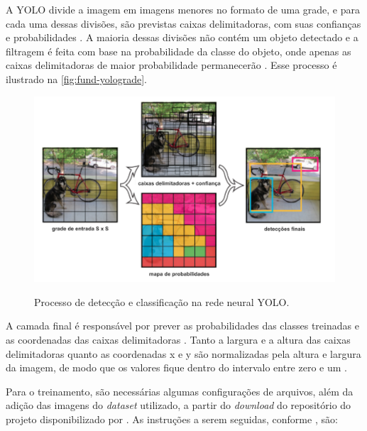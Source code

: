 A YOLO divide a imagem em imagens menores no formato de uma grade, e para cada uma dessas divisões, são previstas caixas delimitadoras, com suas confianças e probabilidades \cite{ref:Redmon-et-al}. A maioria dessas divisões não contém um objeto detectado e a filtragem é feita com base na probabilidade da classe do objeto, onde apenas as caixas delimitadoras de maior probabilidade permanecerão \cite{ref:Sivarajkumar}. Esse processo é ilustrado na \autoref{fig:fund-yolograde}.

\begin{figure}[h!] %
  \centering
  \caption{Processo de detecção e classificação na rede neural YOLO.}
  \includegraphics[scale=0.95]{img/img-fundamentacao-yolograde.pdf}
  \label{fig:fund-yolograde}
\end{figure}

A camada final é responsável por prever as probabilidades das classes treinadas e as coordenadas das caixas delimitadoras \cite{ref:Redmon-et-al}. Tanto a largura e a altura das caixas delimitadoras quanto as coordenadas x e y são normalizadas pela altura e largura da imagem, de modo que os valores fique dentro do intervalo entre zero e um \cite{ref:Redmon-et-al}.

Para o treinamento, são necessárias algumas configurações de arquivos, além da adição das imagens do \textit{dataset} utilizado, a partir do \textit{download} do repositório do projeto disponibilizado por . As instruções a serem seguidas, conforme , são:


